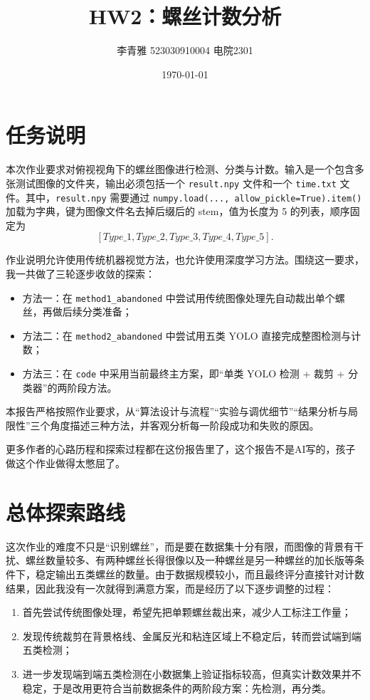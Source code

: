 \documentclass[12pt,a4paper]{ctexart}
\title{HW2：螺丝计数分析}
\author{李青雅 523030910004 电院2301}
\date{\today}
\begin{document}
\maketitle
\newpage
\tableofcontents %
\newpage

\section{任务说明}

本次作业要求对俯视视角下的螺丝图像进行检测、分类与计数。输入是一个包含多张测试图像的文件夹，输出必须包括一个 \texttt{result.npy} 文件和一个 \texttt{time.txt} 文件。其中，\texttt{result.npy} 需要通过 \texttt{numpy.load(..., allow\_pickle=True).item()} 加载为字典，键为图像文件名去掉后缀后的 stem，值为长度为 5 的列表，顺序固定为
\[
[Type\_1, Type\_2, Type\_3, Type\_4, Type\_5].
\]

作业说明允许使用传统机器视觉方法，也允许使用深度学习方法。围绕这一要求，我一共做了三轮逐步收敛的探索：
\begin{itemize}
    \item 方法一：在 \texttt{method1\_abandoned} 中尝试用传统图像处理先自动裁出单个螺丝，再做后续分类准备；
    \item 方法二：在 \texttt{method2\_abandoned} 中尝试用五类 YOLO 直接完成整图检测与计数；
    \item 方法三：在 \texttt{code} 中采用当前最终主方案，即“单类 YOLO 检测 + 裁剪 + 分类器”的两阶段方法。
\end{itemize}

本报告严格按照作业要求，从“算法设计与流程”“实验与调优细节”“结果分析与局限性”三个角度描述三种方法，并客观分析每一阶段成功和失败的原因。

更多作者的心路历程和探索过程都在这份报告里了，这个报告不是AI写的，孩子做这个作业做得太憋屈了。

\section{总体探索路线}

这次作业的难度不只是“识别螺丝”，而是要在数据集十分有限，而图像的背景有干扰、螺丝数量较多、有两种螺丝长得很像以及一种螺丝是另一种螺丝的加长版等条件下，稳定输出五类螺丝的数量。由于数据规模较小，而且最终评分直接针对计数结果，因此我没有一次就得到满意方案，而是经历了以下逐步调整的过程：
\begin{enumerate}
    \item 首先尝试传统图像处理，希望先把单颗螺丝裁出来，减少人工标注工作量；
    \item 发现传统裁剪在背景格线、金属反光和粘连区域上不稳定后，转而尝试端到端五类检测；
    \item 进一步发现端到端五类检测在小数据集上验证指标较高，但真实计数效果并不稳定，于是改用更符合当前数据条件的两阶段方案：先检测，再分类。
\end{enumerate}
\end{document}
